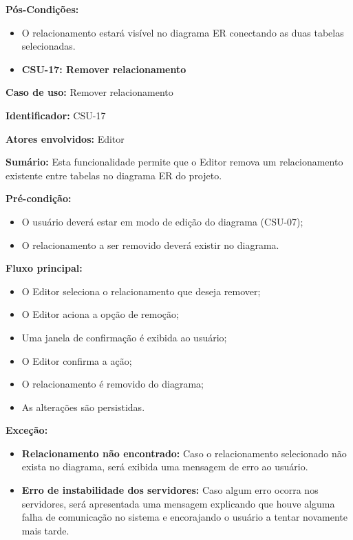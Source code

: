 \textbf{Pós-Condições:}
\begin{itemize}
    \item O relacionamento estará visível no diagrama ER conectando as duas tabelas selecionadas.
\end{itemize}

\vspace{1em}

\begin{itemize}
    \item \textbf{CSU-17: Remover relacionamento}
\end{itemize}

\textbf{Caso de uso:} Remover relacionamento

\textbf{Identificador:} CSU-17

\textbf{Atores envolvidos:} Editor

\textbf{Sumário:} Esta funcionalidade permite que o Editor remova um relacionamento existente entre tabelas no diagrama ER do projeto.

\textbf{Pré-condição:}
\begin{itemize}
    \item O usuário deverá estar em modo de edição do diagrama (CSU-07);
    \item O relacionamento a ser removido deverá existir no diagrama.
\end{itemize}

\textbf{Fluxo principal:}
\begin{itemize}
    \item O Editor seleciona o relacionamento que deseja remover;
    \item O Editor aciona a opção de remoção;
    \item Uma janela de confirmação é exibida ao usuário;
    \item O Editor confirma a ação;
    \item O relacionamento é removido do diagrama;
    \item As alterações são persistidas.
\end{itemize}

\textbf{Exceção:}
\begin{itemize}
    \item \textbf{Relacionamento não encontrado:} Caso o relacionamento selecionado não exista no diagrama, será exibida uma mensagem de erro ao usuário.
    \item \textbf{Erro de instabilidade dos servidores:} Caso algum erro ocorra nos servidores, será apresentada uma mensagem explicando que houve alguma falha de comunicação no sistema e encorajando o usuário a tentar novamente mais tarde.
\end{itemize}

